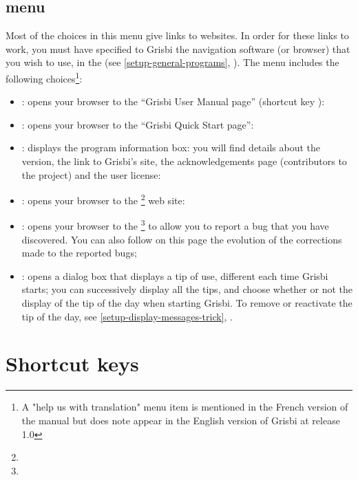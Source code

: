 \subsection{ menu\label{home-menus-help}}

Most of the choices in this menu give links to websites. In order for these links to work, you must have specified to Grisbi the navigation software (or browser) that you wish to use, in the  (see \vref{setup-general-programs}, ). The  menu includes the following choices\footnote{ A "help us with translation" menu item is mentioned in the French version of the manual but does note appear in the English version of Grisbi at release 1.0}:

\begin{itemize}
	\item {}: opens your browser to the  \enquote{Grisbi User Manual page} (shortcut key  ):
	\item {}: opens your browser to the  \enquote{Grisbi Quick Start page}:
	\item {}: displays the program information box: you will find details about the version, the link to Grisbi's site, the acknowledgements page (contributors to the project) and the user license:
	\item {}: opens your browser to the \footnote{\urlGrisbi{}} web site:
	\item {}: opens your browser to the \footnote{\urlBugTracker{}} to allow you to report a bug that you have discovered. You can also follow on this page the evolution of the corrections made to the reported bugs;
	\item {}: opens a dialog box that displays a tip of use, different each time Grisbi starts; you can successively display all the tips, and choose whether or not the display of the tip of the day when starting Grisbi. To remove or reactivate the tip of the day, see \vref{setup-display-messages-trick}, .
\end{itemize}


\section{Shortcut keys\label{home-shortcuts}}


